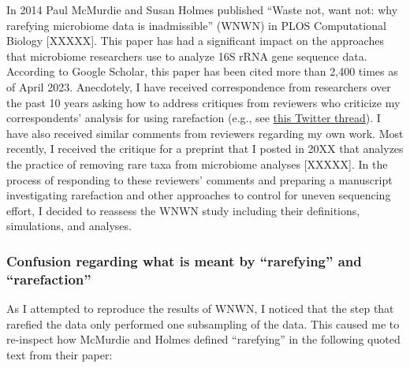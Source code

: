 \documentclass[
]{article}
\begin{document}
In 2014 Paul McMurdie and Susan Holmes published ``Waste not, want not:
why rarefying microbiome data is inadmissible'' (WNWN) in PLOS
Computational Biology {[}XXXXX{]}. This paper has had a significant
impact on the approaches that microbiome researchers use to analyze 16S
rRNA gene sequence data. According to Google Scholar, this paper has
been cited more than 2,400 times as of April 2023. Anecdotely, I have
received correspondence from researchers over the past 10 years asking
how to address critiques from reviewers who criticize my correspondents'
analysis for using rarefaction (e.g., see
\href{https://twitter.com/inanna_nalytica/status/1264299305067786242}{this
Twitter thread}). I have also received similar comments from reviewers
regarding my own work. Most recently, I received the critique for a
preprint that I posted in 20XX that analyzes the practice of removing
rare taxa from microbiome analyses {[}XXXXX{]}. In the process of
responding to these reviewers' comments and preparing a manuscript
investigating rarefaction and other approaches to control for uneven
sequencing effort, I decided to reassess the WNWN study including their
definitions, simulations, and analyses.

\hypertarget{confusion-regarding-what-is-meant-by-rarefying-and-rarefaction}{%
\subsubsection{Confusion regarding what is meant by ``rarefying'' and
``rarefaction''}\label{confusion-regarding-what-is-meant-by-rarefying-and-rarefaction}}

As I attempted to reproduce the results of WNWN, I noticed that the step
that rarefied the data only performed one subsampling of the data. This
caused me to re-inspect how McMurdie and Holmes defined ``rarefying'' in
the following quoted text from their paper:
\end{document}
